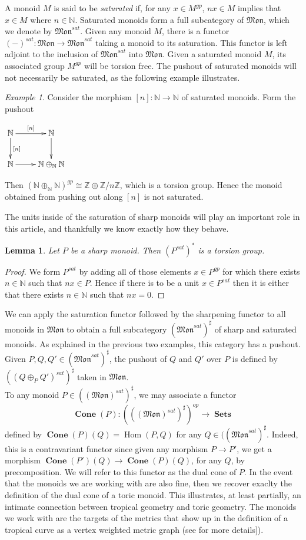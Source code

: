 \documentclass[12pt]{amsart}
\numberwithin{equation}{section}
\theoremstyle{plain}
\newtheorem{lem}[equation]{Lemma}
\theoremstyle{remark}
\newtheorem{exm}[equation]{Example}
\DeclareMathOperator{\Hom}{Hom}
\DeclareMathOperator{\Sets}{\mathbf{Sets}}
\DeclareMathOperator{\Cone}{\textbf{Cone}}
\newcommand{\Z}{\mathbb Z}
\newcommand{\NN}{\mathbb N}
\newcommand{\Mon}{\mathfrak{Mon}}
\begin{document}
	A monoid $M$ is said to be \emph{saturated} if, for any $x\in M^{gp}$, $nx\in M$ implies that $x\in M$ where $n\in\NN$. Saturated monoids form a full subcategory of $\Mon$, which we denote by $\Mon^{sat}$. Given any monoid $M$, there is a functor $(-)^{sat}:\Mon\to \Mon^{sat}$ taking a monoid to its saturation. This functor is left adjoint to the inclusion of $\Mon^{sat}$ into $\Mon$. Given a saturated monoid $M$, its associated group $M^{gp}$ will be torsion free. The pushout of saturated monoids will not necessarily be saturated, as the following example illustrates.
\begin{exm}\label{notSat}
	Consider the morphism $[n]:\NN\to \NN$ of saturated monoids. Form the pushout 
\begin{center}
	$\xymatrix{
		\NN \ar[r]^{[n]} \ar[d]^{[n]} & \NN\ar[d]\\
		\NN \ar[r] & \NN\oplus_{\NN} \NN
	}$
\end{center}
Then $(\NN\oplus_{\NN} \NN)^{gp} \cong \Z\oplus \Z/ n\Z$, which is a torsion group. Hence the monoid obtained from pushing out along $[n]$ is not saturated. 
\end{exm}
The units inside of the saturation of sharp monoids will play an important role in this article, and thankfully we know exactly how they behave.
\begin{lem}\label{torsionUnits}
	Let $P$ be a sharp monoid. Then $(P^{sat})^*$ is a torsion group.
\end{lem}
\begin{proof}
	We form $P^{sat}$ by adding all of those elements $x\in P^{gp}$ for which there exists $n\in\NN$ such that $nx\in P$. Hence if there is to be a unit $x\in P^{sat}$ then it is either that there exists $n\in\NN$ such that $nx = 0$.
\end{proof}
	We can apply the saturation functor followed by the sharpening functor to all monoids in $\Mon$ to obtain a full subcategory $(\Mon^{sat})^{\sharp}$ of sharp and saturated monoids. As explained in the previous two examples, this category has a pushout. Given $P,Q,Q'\in (\Mon^{sat})^{\sharp}$, the pushout of $Q$ and $Q'$ over $P$ is defined by $((Q\oplus_P Q')^{sat})^{\sharp}$ taken in $\Mon$.\\
	
	To any monoid $P\in((\Mon)^{sat})^{\sharp}$, we may associate a functor 
	$$\Cone(P):(((\Mon)^{sat})^{\sharp})^{op}\to \Sets$$
defined by $\Cone(P)(Q) = \Hom(P,Q)$ for any $Q\in ((\Mon^{sat})^{\sharp}$. Indeed, this is a contravariant functor since given any morphism $P\to P'$, we get a morphism $\Cone(P')(Q) \to \Cone(P)(Q)$, for any $Q$, by precomposition. We will refer to this functor as the dual cone of $P$. In the event that the monoids we are working with are also fine, then we recover exaclty the definition of the dual cone of a toric monoid. This illustrates, at least partially, an intimate connection between tropical geometry and toric geometry. The monoids we work with are the targets of the metrics that show up in the definition of a tropical curve as a vertex weighted metric graph (see \cite{CCUW} for more details]). 
	
\end{document}
